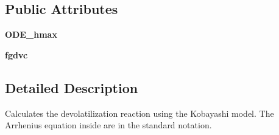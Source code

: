 \subsection*{\-Public \-Attributes}
\begin{DoxyCompactItemize}
\item 
\hypertarget{classFit__one__run_1_1Kobayashi_af2b1dabc461a6f40928ae01a65c448b9}{{\bfseries \-O\-D\-E\-\_\-hmax}}\label{classFit__one__run_1_1Kobayashi_af2b1dabc461a6f40928ae01a65c448b9}

\item 
\hypertarget{classFit__one__run_1_1Kobayashi_abd715c8f6aca9bbaf6e4b56f44f5739a}{{\bfseries fgdvc}}\label{classFit__one__run_1_1Kobayashi_abd715c8f6aca9bbaf6e4b56f44f5739a}

\end{DoxyCompactItemize}


\subsection{\-Detailed \-Description}
\begin{DoxyVerb}Calculates the devolatilization reaction using the Kobayashi model. The Arrhenius equation inside are in the standard notation.\end{DoxyVerb}
 

